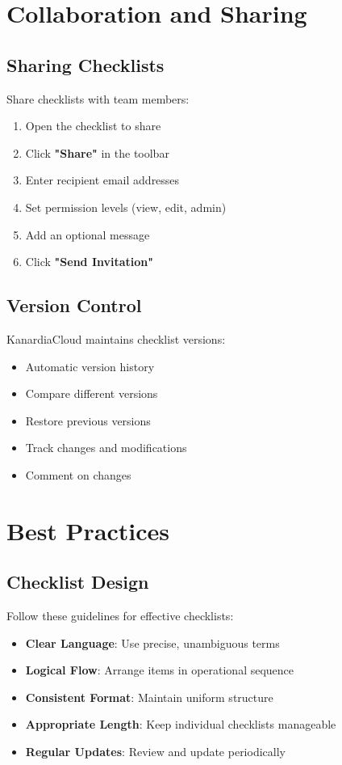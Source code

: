 \section{Collaboration and Sharing}

\subsection{Sharing Checklists}

Share checklists with team members:

\begin{enumerate}
    \item Open the checklist to share
    \item Click \textbf{"Share"} in the toolbar
    \item Enter recipient email addresses
    \item Set permission levels (view, edit, admin)
    \item Add an optional message
    \item Click \textbf{"Send Invitation"}
\end{enumerate}

\subsection{Version Control}

KanardiaCloud maintains checklist versions:

\begin{itemize}
    \item Automatic version history
    \item Compare different versions
    \item Restore previous versions
    \item Track changes and modifications
    \item Comment on changes
\end{itemize}

\section{Best Practices}

\subsection{Checklist Design}

Follow these guidelines for effective checklists:

\begin{itemize}
    \item \textbf{Clear Language}: Use precise, unambiguous terms
    \item \textbf{Logical Flow}: Arrange items in operational sequence
    \item \textbf{Consistent Format}: Maintain uniform structure
    \item \textbf{Appropriate Length}: Keep individual checklists manageable
    \item \textbf{Regular Updates}: Review and update periodically
\end{itemize}

